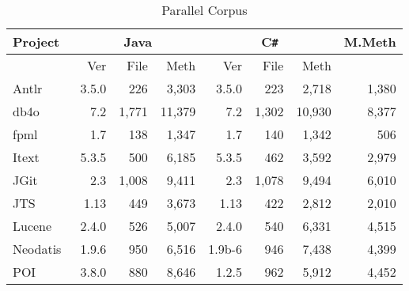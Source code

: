 \begin{table}[t]
       \small
	\tabcolsep 3pt
  \centering
  \caption{Parallel Corpus}
    \begin{tabular}{l|rrr|rrr|r}
    \toprule
    Project & \multicolumn{3}{c}{Java} \vline& \multicolumn{3}{c}{C\texttt{\#}} \vline& M.Meth \\
    \hline
		& Ver   &File 		&Meth 	&Ver 			&File 		&Meth 		&  \\
		\hline					
    Antlr~\cite{Antlr} 		   & 3.5.0 & 226   	& 3,303  & 3.5.0 	& 223   	& 2,718  	& 1,380 \\
    db4o~\cite{db4o}  		   & 7.2   & 1,771 	& 11,379 & 7.2   	& 1,302  	& 10,930 	& 8,377 \\
    fpml~\cite{fpml}  		   & 1.7   & 138   	& 1,347  & 1.7   	& 140   	& 1,342  	& 506 \\
    Itext~\cite{Itext} 		   & 5.3.5 & 500   	& 6,185  & 5.3.5 	& 462   	& 3,592  	& 2,979 \\
    JGit~\cite{JGit}  		   & 2.3   & 1,008 	& 9,411  & 2.3   	& 1,078  	& 9,494  	& 6,010 \\
    JTS~\cite{JTS}   		   & 1.13  & 449   	& 3,673  & 1.13  	& 422   	& 2,812  	& 2,010 \\
    Lucene~\cite{Lucene}  	   & 2.4.0 & 526   	& 5,007  & 2.4.0 	& 540   	& 6,331  	& 4,515 \\
    Neodatis~\cite{Neodatis}       & 1.9.6 & 950   	& 6,516  & 1.9b-6       & 946           & 7,438 	& 4,399 \\
    POI~\cite{POI}   		   & 3.8.0 & 880        & 8,646  & 1.2.5 	& 962   	& 5,912  	& 4,452 \\
    \bottomrule
    \end{tabular}%
  \label{tab:systems}%
\end{table}%

